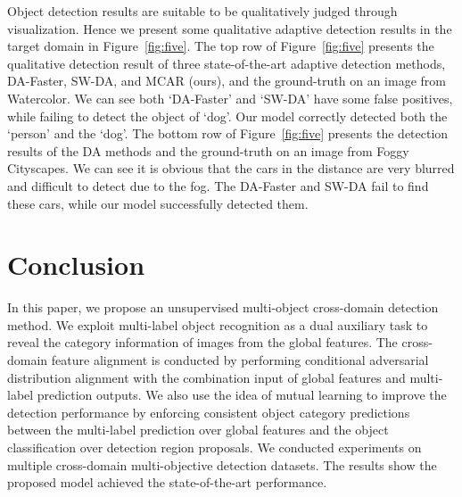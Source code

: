 \documentclass[runningheads]{llncs}
\begin{document}
Object detection results are suitable to be qualitatively judged through visualization. 
Hence we present some qualitative adaptive detection results in the target domain in Figure~\ref{fig:five}.
The top row of  Figure~\ref{fig:five} presents the qualitative detection result of three 
state-of-the-art adaptive detection methods, 
DA-Faster, SW-DA, and MCAR (ours), and the ground-truth on an image from Watercolor.
We can see both 
`DA-Faster' and `SW-DA' have some false positives, while failing to detect the object of `dog'. 
Our model correctly detected both the `person' and the `dog'.
The bottom row of Figure~\ref{fig:five} presents the detection results of the DA methods 
and the ground-truth on an image from Foggy Cityscapes. 
We can see it is obvious that the cars in the distance are very blurred and difficult to detect due to the fog.
The DA-Faster and SW-DA fail to find these cars,
while our model successfully detected them.
\section{Conclusion}

In this paper, we propose an unsupervised multi-object cross-domain detection method. 
We exploit multi-label object recognition as a dual auxiliary task
to reveal the category information of images from the global features. 
The cross-domain feature alignment is conducted by 
performing conditional adversarial distribution alignment with
the combination input of global features and multi-label prediction outputs.
We also use the idea of mutual learning 
to improve the detection performance 
by enforcing consistent object category predictions
between the multi-label prediction over global features 
and the object classification over detection region proposals.
We conducted experiments on multiple cross-domain multi-objective detection datasets.
The results show the proposed model achieved the state-of-the-art performance.



\clearpage



\end{document}
